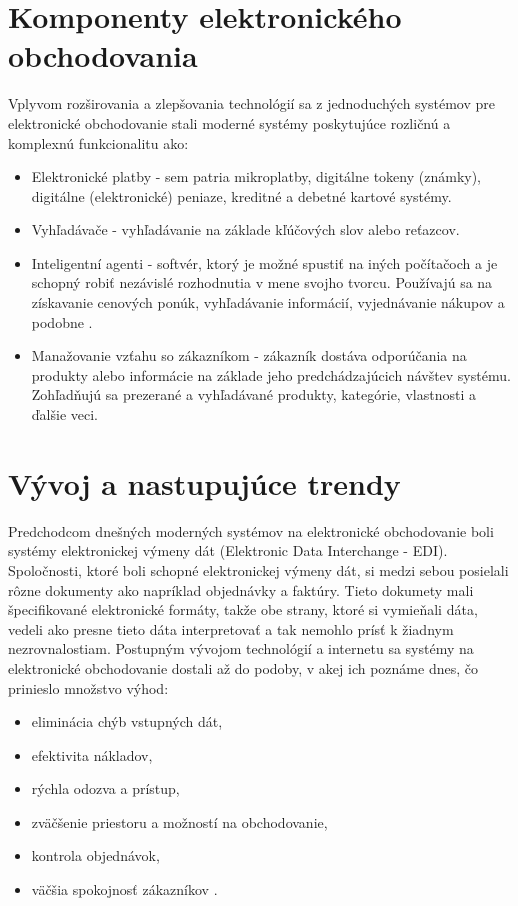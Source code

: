 \documentclass[
  printed, %
  table,   %
  lof,     %
  nolot,     %
  twoside,  
]{fithesis3}
\begin{document}
\section{Komponenty elektronického obchodovania}
Vplyvom rozširovania a zlepšovania technológií sa z jednoduchých systémov pre elektronické obchodovanie stali moderné systémy poskytujúce rozličnú a komplexnú funkcionalitu ako:
\begin{itemize}
 \item Elektronické platby - sem patria mikroplatby, digitálne tokeny (známky), digitálne (elektronické) peniaze, kreditné a debetné kartové systémy.
 \item Vyhľadávače - vyhľadávanie na základe kľúčových slov alebo reťazcov.
 \item Inteligentní agenti - softvér, ktorý je možné spustiť na iných počítačoch a je schopný robiť nezávislé rozhodnutia v mene svojho tvorcu. Používajú sa na získavanie cenových ponúk, vyhľadávanie informácií, vyjednávanie nákupov a podobne \cite{ec2}.
 \item Manažovanie vzťahu so zákazníkom - zákazník dostáva odporúčania na produkty alebo informácie na základe jeho predchádzajúcich návštev systému. Zohľadňujú sa prezerané a vyhľadávané produkty, kategórie, vlastnosti a ďalšie veci.
\end{itemize}
\section{Vývoj a nastupujúce trendy}
Predchodcom dnešných moderných systémov na elektronické obchodovanie boli systémy elektronickej výmeny dát (Elektronic Data Interchange - EDI). Spoločnosti, ktoré boli schopné elektronickej výmeny dát, si medzi sebou posielali rôzne dokumenty ako napríklad objednávky a faktúry. Tieto dokumety mali špecifikované elektronické formáty, takže obe strany, ktoré si vymieňali dáta, vedeli ako presne tieto dáta interpretovať a tak nemohlo prísť k žiadnym nezrovnalostiam.
Postupným vývojom technológií a internetu sa systémy na elektronické obchodovanie dostali až do podoby, v akej ich poznáme dnes, čo prinieslo množstvo výhod:
\begin{itemize}
 \item eliminácia chýb vstupných dát,
 \item efektivita nákladov,
 \item rýchla odozva a prístup,
 \item zväčšenie priestoru a možností na obchodovanie,
 \item kontrola objednávok,
 \item väčšia spokojnosť zákazníkov \cite{ec2}.
\end{itemize}
\end{document}
